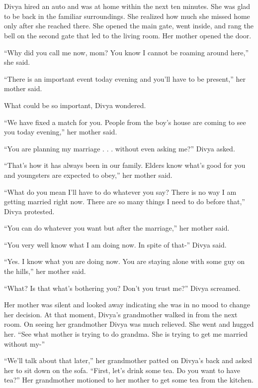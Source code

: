 \chapter{}

Divya hired an auto and was at home within the next ten minutes. She was glad to
be back in the familiar surroundings. She realized how much she missed home only
after she reached there. She opened the main gate, went inside, and rang the
bell on the second gate that led to the living room. Her mother opened the door.

“Why did you call me now, mom? You know I cannot be roaming around here,” she
said.

“There is an important event today evening and you'll have to be present,” her
mother said.

What could be so important, Divya wondered.

“We have fixed a match for you. People from the boy's house are coming to see
you today evening,” her mother said.

“You are planning my marriage . . . without even asking me?” Divya asked.

“That's how it has always been in our family. Elders know what's good for you
and youngsters are expected to obey,” her mother said.

“What do you mean I'll have to do whatever you say? There is no way I am getting
married right now. There are so many things I need to do before that,” Divya
protested.

“You can do whatever you want but after the marriage,” her mother said.

“You very well know what I am doing now. In spite of that-” Divya said.

“Yes. I know what you are doing now. You are staying alone with some guy on the
hills,” her mother said.

“What? Is that what's bothering you? Don't you trust me?” Divya screamed.

Her mother was silent and looked away indicating she was in no mood to change
her decision. At that moment, Divya's grandmother walked in from the next room.
On seeing her grandmother Divya was much relieved. She went and hugged her. “See
what mother is trying to do grandma. She is trying to get me married without
my-”

“We'll talk about that later,” her grandmother patted on Divya's back and asked
her to sit down on the sofa. “First, let's drink some tea. Do you want to have
tea?” Her grandmother motioned to her mother to get some tea from the kitchen.

